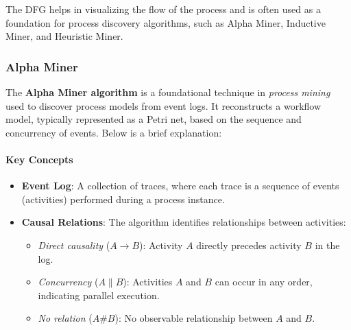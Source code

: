 The DFG helps in visualizing the flow of the process and is often used as a foundation for process discovery algorithms, such as Alpha Miner, Inductive Miner, and Heuristic Miner.


\subsubsection{Alpha Miner}
The \textbf{Alpha Miner algorithm} is a foundational technique in \textit{process mining} used to discover process models from event logs. It reconstructs a workflow model, typically represented as a Petri net, based on the sequence and concurrency of events. Below is a brief explanation:

\paragraph{Key Concepts}
\begin{itemize}
    \item \textbf{Event Log}: A collection of traces, where each trace is a sequence of events (activities) performed during a process instance.
    \item \textbf{Causal Relations}: The algorithm identifies relationships between activities:
    \begin{itemize}
        \item \textit{Direct causality} ($A \rightarrow B$): Activity $A$ directly precedes activity $B$ in the log.
        \item \textit{Concurrency} ($A \parallel B$): Activities $A$ and $B$ can occur in any order, indicating parallel execution.
        \item \textit{No relation} ($A \# B$): No observable relationship between $A$ and $B$.
    \end{itemize}
\end{itemize}

